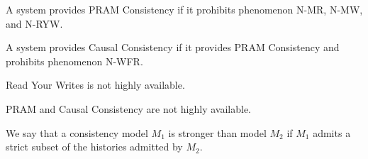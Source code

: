 \begin{definition}
A system provides PRAM Consistency if it prohibits phenomenon N-MR,
N-MW, and N-RYW.
\end{definition}

\begin{definition}
A system provides Causal Consistency if it provides PRAM Consistency
and prohibits phenomenon N-WFR.
\end{definition}


\begin{observation}
Read Your Writes is not highly available.
\end{observation}

\begin{corollary}
PRAM and Causal Consistency are not highly available.
\end{corollary}

\begin{definition}
\end{definition}

\begin{definition}
\end{definition}

\begin{definition}
\end{definition}

\begin{definition}
\end{definition}

\begin{definition}
\end{definition}

\begin{definition}
\end{definition}

\begin{definition}
\end{definition}

\begin{definition}
\end{definition}

\begin{definition}
\end{definition}

\begin{definition}
We say that a consistency model $M_1$ is stronger than model $M_2$ if
$M_1$ admits a strict subset of the histories admitted by $M_2$.
\end{definition}

